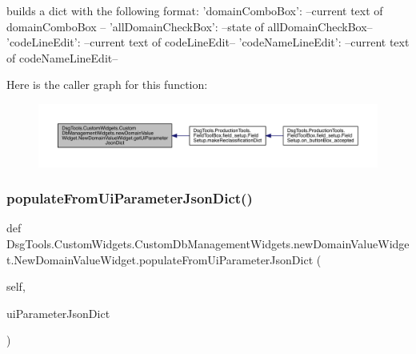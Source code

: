 \begin{DoxyVerb}builds a dict with the following format:
{
    'domainComboBox': --current text of domainComboBox --
    'allDomainCheckBox': --state of allDomainCheckBox--
    'codeLineEdit': --current text of codeLineEdit--
    'codeNameLineEdit': --current text of codeNameLineEdit--
}
\end{DoxyVerb}
 Here is the caller graph for this function\+:
\nopagebreak
\begin{figure}[H]
\begin{center}
\leavevmode
\includegraphics[width=350pt]{class_dsg_tools_1_1_custom_widgets_1_1_custom_db_management_widgets_1_1new_domain_value_widget_1_1_new_domain_value_widget_a427a9a417f695e34c49f142d64aee16c_icgraph}
\end{center}
\end{figure}
\mbox{\label{class_dsg_tools_1_1_custom_widgets_1_1_custom_db_management_widgets_1_1new_domain_value_widget_1_1_new_domain_value_widget_a31323073d45b18bb4f984536794a63ba}} 
\subsubsection{\texorpdfstring{populate\+From\+Ui\+Parameter\+Json\+Dict()}{populateFromUiParameterJsonDict()}}
{\footnotesize\ttfamily def Dsg\+Tools.\+Custom\+Widgets.\+Custom\+Db\+Management\+Widgets.\+new\+Domain\+Value\+Widget.\+New\+Domain\+Value\+Widget.\+populate\+From\+Ui\+Parameter\+Json\+Dict (\begin{DoxyParamCaption}\item[{}]{self,  }\item[{}]{ui\+Parameter\+Json\+Dict }\end{DoxyParamCaption})}


